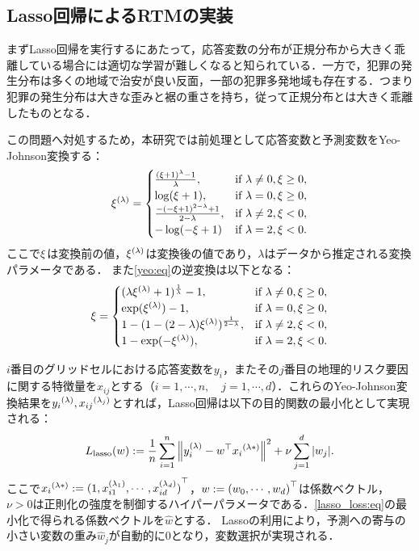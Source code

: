 \subsection{Lasso回帰によるRTMの実装}
まずLasso回帰を実行するにあたって，応答変数の分布が正規分布から大きく乖離している場合には適切な学習が難しくなると知られている\cite{islp, esl}．一方で，犯罪の発生分布は多くの地域で治安が良い反面，一部の犯罪多発地域も存在する．つまり犯罪の発生分布は大きな歪みと裾の重さを持ち，従って正規分布とは大きく乖離したものとなる．
%


この問題へ対処するため，本研究では前処理として応答変数と予測変数をYeo-Johnson変換\cite{yeo}する：
\begin{align}\label{yeo:eq}
  {\xi}^{(\lambda)} =
   \begin{cases} 
   \frac{(\xi+1)^\lambda - 1}{\lambda}, & \text{if } \lambda \neq 0, \xi \geq 0,  \\ 
   \log(\xi+1), & \text{if } \lambda = 0, \xi \geq 0,   \\ 
   \frac{-(-\xi+1)^{2-\lambda} + 1}{2-\lambda}, & \text{if } \lambda \neq 2, \xi < 0,  \\ 
   -\log(-\xi+1) & \text{if } \lambda = 2, \xi < 0.
   \end{cases}  
\end{align}
ここで$\xi$は変換前の値，${\xi}^{(\lambda)}$は変換後の値であり，$\lambda$はデータから推定される変換パラメータである．
また\cref{yeo:eq}の逆変換は以下となる：
\begin{align}
  \label{yeo_inv:eq}
  \xi =
  \begin{cases} 
    (\lambda{\xi}^{(\lambda)}+1)^{\frac{1}{\lambda}}-1, & \text{if } \lambda \neq 0, \xi \geq 0,  \\ 
  \exp({\xi}^{(\lambda)})-1, & \text{if } \lambda = 0, \xi \geq 0,   \\ 
  1-(1-(2-\lambda){\xi}^{(\lambda)})^{\frac{1}{2-\lambda}}, & \text{if } \lambda \neq 2, \xi < 0,  \\ 
  1-\exp(-{\xi}^{(\lambda)}), & \text{if } \lambda = 2,  \xi < 0.
  \end{cases}  
\end{align}


$i$番目のグリッドセルにおける応答変数を$y_i$，またその$j$番目の地理的リスク要因に関する特徴量を$x_{ij}$とする（$i=1,\cdots, n,\quad j=1,\cdots, d$）．これらのYeo-Johnson変換結果を${y_i}^{(\lambda)}, {x_{ij}}^{(\lambda_j)}$とすれば，Lasso回帰は以下の目的関数の最小化として実現される\cite{Lasso}：
\begin{align} \label{lasso_loss:eq}
  L_\mathrm{lasso}(w) := \frac{1}{n}\sum_{i=1}^n\left\|
    {y}^{(\lambda)}_i-{w}^\top{{x_i}^{(\lambda*)}}
    \right\|^2 + \nu\sum_{j=1}^{d}|w_j|. 
\end{align}
ここで${x_i}^{(\lambda*)}:={(1, x_{i1}^{(\lambda_1)}, \cdots, x_{id}^{(\lambda_d)})}^\top$，$w:={(w_0, \cdots, w_d)}^\top$は係数ベクトル，$\nu>0$は正則化の強度を制御するハイパーパラメータである．\cref{lasso_loss:eq}の最小化で得られる係数ベクトルを$\hat w$とする．
Lassoの利用により，予測への寄与の小さい変数の重み$\hat w_j$が自動的に$0$となり，変数選択が実現される\cite{Lasso, islp, esl}．

